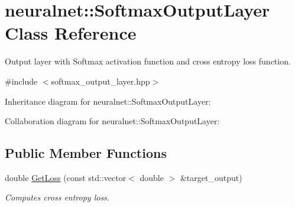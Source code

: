 \hypertarget{classneuralnet_1_1SoftmaxOutputLayer}{}\section{neuralnet\+:\+:Softmax\+Output\+Layer Class Reference}
\label{classneuralnet_1_1SoftmaxOutputLayer}


Output layer with Softmax activation function and cross entropy loss function.  




{\ttfamily \#include $<$softmax\+\_\+output\+\_\+layer.\+hpp$>$}



Inheritance diagram for neuralnet\+:\+:Softmax\+Output\+Layer\+:


Collaboration diagram for neuralnet\+:\+:Softmax\+Output\+Layer\+:
\subsection*{Public Member Functions}
\begin{DoxyCompactItemize}
\item 
double \hyperlink{classneuralnet_1_1SoftmaxOutputLayer_a6cc46c109780dca4700f622b2a378aa8}{Get\+Loss} (const std\+::vector$<$ double $>$ \&target\+\_\+output)
\begin{DoxyCompactList}\small\item\em Computes cross entropy loss. \end{DoxyCompactList}\end{DoxyCompactItemize}
